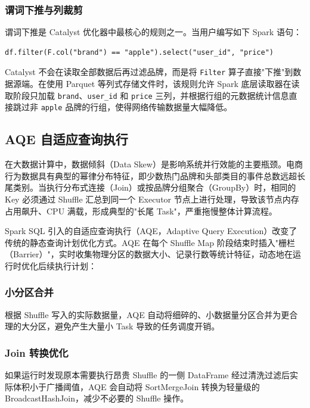 \subsubsection{谓词下推与列裁剪}

谓词下推是 Catalyst 优化器中最核心的规则之一。当用户编写如下 Spark 语句：
\begin{lstlisting}[style=codexcode]
df.filter(F.col("brand") == "apple").select("user_id", "price")
\end{lstlisting}
Catalyst 不会在读取全部数据后再过滤品牌，而是将 \texttt{Filter} 算子直接"下推"到数据源端。在使用 Parquet 等列式存储文件时，该规则允许 Spark 底层读取器在读取阶段只加载 \texttt{brand}、\texttt{user\_id} 和 \texttt{price} 三列，并根据行组的元数据统计信息直接跳过非 \texttt{apple} 品牌的行组，使得网络传输数据量大幅降低。

\subsection{AQE 自适应查询执行}

在大数据计算中，数据倾斜（Data Skew）是影响系统并行效能的主要瓶颈。电商行为数据具有典型的幂律分布特征，即少数热门品牌和头部类目的事件总数远超长尾类别。当执行分布式连接（Join）或按品牌分组聚合（GroupBy）时，相同的 Key 必须通过 Shuffle 汇总到同一个 Executor 节点上进行处理，导致该节点内存占用飙升、CPU 满载，形成典型的"长尾 Task"，严重拖慢整体计算流程。

Spark SQL 引入的自适应查询执行（AQE，Adaptive Query Execution）改变了传统的静态查询计划优化方式。AQE 在每个 Shuffle Map 阶段结束时插入"栅栏（Barrier）"，实时收集物理分区的数据大小、记录行数等统计特征，动态地在运行时优化后续执行计划：

\subsubsection{小分区合并}

根据 Shuffle 写入的实际数据量，AQE 自动将细碎的、小数据量分区合并为更合理的大分区，避免产生大量小 Task 导致的任务调度开销。

\subsubsection{Join 转换优化}

如果运行时发现原本需要执行昂贵 Shuffle 的一侧 DataFrame 经过清洗过滤后实际体积小于广播阈值，AQE 会自动将 SortMergeJoin 转换为轻量级的 BroadcastHashJoin，减少不必要的 Shuffle 操作。

